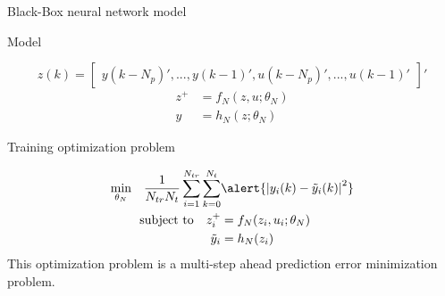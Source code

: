 \documentclass[xcolor=dvipsnames, 8pt]{beamer} %
\begin{document}
\begin{frame}{Black-Box neural network model}

	\begin{block}{Model}
	
	\begin{equation*}
		z(k) = \begin{bmatrix} y(k-N_p)', ..., y(k-1)',
							   u(k-N_p)', ..., u(k-1)' 
			   \end{bmatrix}'
	\end{equation*}
	\begin{align*}
		z^+ &= f_N(z, u;\theta_N) \\ 
		y &= h_N(z;\theta_N)
	\end{align*}
	\end{block}
	\pause
	\begin{block}{Training optimization problem}
		
	\begin{align*}
		\underset{\theta_N}{\textnormal{min}} \quad \dfrac{1}{N_{tr} 
		N_t} \sum_{i=1}^{N_{tr}}
		\sum_{k=0}^{N_t} & \alert{\norm{y_i(k) - \tilde{y}_i(k)}^2} \\ 
		\textnormal{subject to} \quad z_i^+ & = f_N(z_i, u_i;\theta_N) \\
								  \tilde{y}_i &= h_N(z_i)
	\end{align*}
	This optimization problem is a multi-step ahead prediction error 
	minimization problem.	
	\end{block}

\end{frame}
\end{document}
